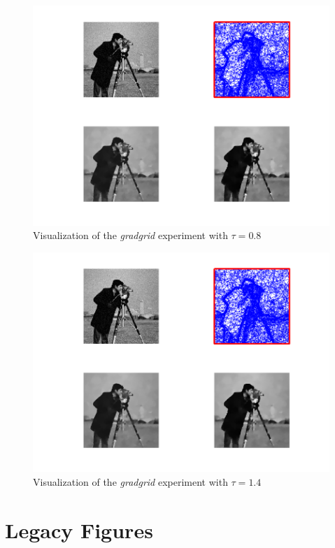 \documentclass{report}
\begin{document}
\begin{figure}
	\includegraphics[width=\textwidth]{../out/report_gradgrid1.png}
	\caption{Visualization of the \textit{gradgrid} experiment with $\tau = 0.8$}
	\label{vis:gradgrid1}
\end{figure}

\begin{figure}
	\includegraphics[width=\textwidth]{../out/report_gradgrid2.png}
	\caption{Visualization of the \textit{gradgrid} experiment with $\tau = 1.4$}
	\label{vis:gradgrid2}
\end{figure}

\chapter{Legacy Figures}
\end{document}
